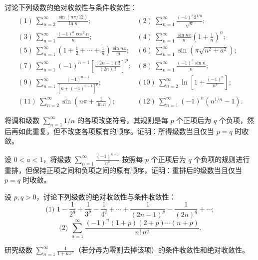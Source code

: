 \begin{xexercise}[1]
讨论下列级数的绝对收敛性与条件收敛性：
\[
\begin{array}{ll}
(1)\ \displaystyle\sum_{n=2}^{\infty}\frac{\sin(n\pi/12)}{\ln n};&
(2)\ \displaystyle\sum_{n=1}^{\infty}\frac{(-1)^n2^{1/n}}{\sqrt n};\\[6pt]
(3)\ \displaystyle\sum_{n=1}^{\infty}\frac{(-1)^n\cos^2n}{n};&
(4)\ \displaystyle\sum_{n=1}^{\infty}\frac{\sin nx}{n}\left(1+\frac1n\right)^n;\\[6pt]
(5)\ \displaystyle\sum_{n=1}^{\infty}\left(1+\frac12+\cdots+\frac1n\right)\frac{\sin nx}{n};&
(6)\ \displaystyle\sum_{n=1}^{\infty}\sin\!\left(\pi\sqrt{n^2+a^2}\right);\\[6pt]
(7)\ \displaystyle\sum_{n=1}^{\infty}(-1)^{n-1}\left[\frac{(2n-1)!!}{(2n)!!}\right]^p;&
(8)\ \displaystyle\sum_{n=1}^{\infty}\frac{(-1)^n\sin n}{n};\\[6pt]
(9)\ \displaystyle\sum_{n=1}^{\infty}\frac{(-1)^{n-1}}{[n+(-1)^{n-1}]^p};&
(10)\ \displaystyle\sum_{n=2}^{\infty}\ln\left[1+\frac{(-1)^n}{n^p}\right];\\[6pt]
(11)\ \displaystyle\sum_{n=2}^{\infty}\sin\left(n\pi+\frac1{\ln n}\right);&
(12)\ \displaystyle\sum_{n=1}^{\infty}(-1)^n(n^{1/n}-1).
\end{array}
\]
\end{xexercise}

\begin{xexercise}[2]
将调和级数 $\sum_{n=1}^{\infty}1/n$ 的各项改变符号，其规则是每 $p$ 个正项后为 $q$ 个负项，然后再如此重复，但不改变各项原有的顺序。证明：所得级数当且仅当 $p=q$ 时收敛。
\end{xexercise}

\begin{xexercise}[3]
设 $0<a<1$，将级数 $\sum_{n=1}^{\infty}\frac{(-1)^{n-1}}{n^a}$ 按照每 $p$ 个正项后为 $q$ 个负项的规则进行重排，但保持正项之间和负项之间的原有顺序，证明：重排后的级数当且仅当 $p=q$ 时收敛。
\end{xexercise}

\begin{xexercise}[4]
设 $p,q>0$，讨论下列级数的绝对收敛性与条件收敛性：
\[
\text{(1) }1-\frac1{2^q}+\frac1{3^p}-\frac1{4^q}+\cdots+\frac1{(2n-1)^p}-\frac1{(2n)^q}+\cdots;
\]
\[
\text{(2) }\sum_{n=1}^{\infty}\frac{(-1)^n(1+p)(2+p)\cdots(n+p)}{n!\,n^q}.
\]
\end{xexercise}

\begin{xexercise}[5]
研究级数 $\sum_{n=1}^{\infty}\frac1{1+nx^n}$（若分母为零则去掉该项）的条件收敛性和绝对收敛性。
\end{xexercise}

